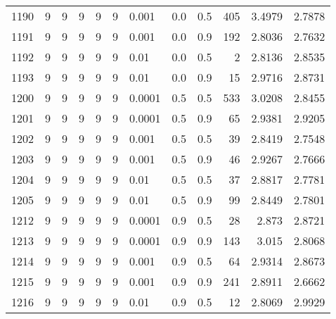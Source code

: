 \begin{longtable}{lrrrrrlrrrrr}
1190 &       9 & 9 & 9 & 9 & 9 &                       0.001 &  0.0 &    0.5 &     405 &                 3.4979 &                 2.7878 \\
1191 &       9 & 9 & 9 & 9 & 9 &                       0.001 &  0.0 &    0.9 &     192 &                 2.8036 &                 2.7632 \\
1192 &       9 & 9 & 9 & 9 & 9 &                        0.01 &  0.0 &    0.5 &       2 &                 2.8136 &                 2.8535 \\
1193 &       9 & 9 & 9 & 9 & 9 &                        0.01 &  0.0 &    0.9 &      15 &                 2.9716 &                 2.8731 \\
1200 &       9 & 9 & 9 & 9 & 9 &                      0.0001 &  0.5 &    0.5 &     533 &                 3.0208 &                 2.8455 \\
1201 &       9 & 9 & 9 & 9 & 9 &                      0.0001 &  0.5 &    0.9 &      65 &                 2.9381 &                 2.9205 \\
1202 &       9 & 9 & 9 & 9 & 9 &                       0.001 &  0.5 &    0.5 &      39 &                 2.8419 &                 2.7548 \\
1203 &       9 & 9 & 9 & 9 & 9 &                       0.001 &  0.5 &    0.9 &      46 &                 2.9267 &                 2.7666 \\
1204 &       9 & 9 & 9 & 9 & 9 &                        0.01 &  0.5 &    0.5 &      37 &                 2.8817 &                 2.7781 \\
1205 &       9 & 9 & 9 & 9 & 9 &                        0.01 &  0.5 &    0.9 &      99 &                 2.8449 &                 2.7801 \\
1212 &       9 & 9 & 9 & 9 & 9 &                      0.0001 &  0.9 &    0.5 &      28 &                  2.873 &                 2.8721 \\
1213 &       9 & 9 & 9 & 9 & 9 &                      0.0001 &  0.9 &    0.9 &     143 &                  3.015 &                 2.8068 \\
1214 &       9 & 9 & 9 & 9 & 9 &                       0.001 &  0.9 &    0.5 &      64 &                 2.9314 &                 2.8673 \\
1215 &       9 & 9 & 9 & 9 & 9 &                       0.001 &  0.9 &    0.9 &     241 &                 2.8911 &                 2.6662 \\
1216 &       9 & 9 & 9 & 9 & 9 &                        0.01 &  0.9 &    0.5 &      12 &                 2.8069 &                 2.9929 \\

\end{longtable}
